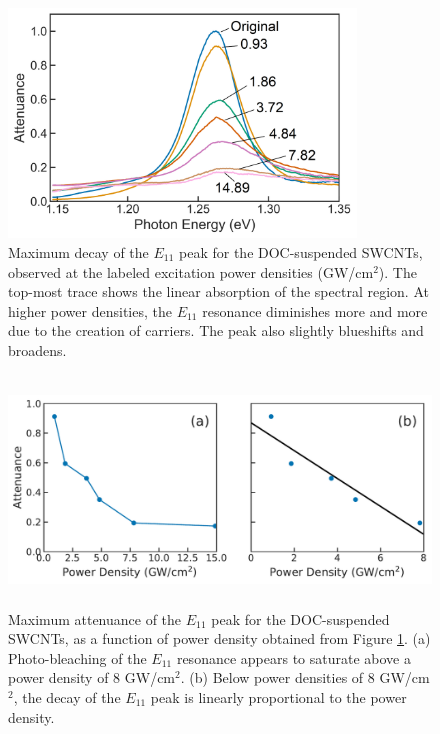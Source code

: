 \begin{figure}[ht]
	\centering
	\includegraphics[height=2.4in]{images/chapter_my_data/Weilu_CNT_abs_max_change_relabeled}
	\caption{Maximum decay of the $E_{11}$ peak for the DOC-suspended SWCNTs, observed at the labeled excitation power densities (GW/cm$^2$). The top-most trace shows the linear absorption of the spectral region. At higher power densities, the $E_{11}$ resonance diminishes more and more due to the creation of carriers. The peak also slightly blueshifts and broadens.}
	\label{fig:weilu_cnt_max_decay}
\end{figure}

\begin{figure}[H]
	\centering
	\includegraphics[height=2.4in]{images/chapter_my_data/Weilu_CNT_max_attenuance_and_fit}
	\caption{Maximum attenuance of the $E_{11}$ peak for the DOC-suspended SWCNTs, as a function of power density obtained from Figure \ref{fig:weilu_cnt_max_decay}. (a) Photo-bleaching of the $E_{11}$ resonance appears to saturate above a power density of 8 GW/cm$^2$. (b) Below power densities of 8 GW/cm$^2$, the decay of the $E_{11}$ peak is linearly proportional to the power density.}
	\label{fig:weilu_cnt_max_decay_fit}
\end{figure}

